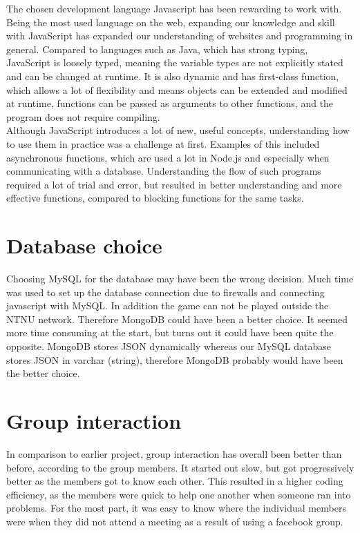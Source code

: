 The chosen development language Javascript has been rewarding to work with. Being the most used language on the web, expanding our knowledge and skill with JavaScript has expanded our understanding of websites and programming in general. Compared to languages such as Java, which has strong typing, JavaScript is loosely typed, meaning the variable types are not explicitly stated and can be changed at runtime. It is also dynamic and has first-class function, which allows a lot of flexibility and means objects can be extended and modified at runtime, functions can be passed as arguments to other functions, and the program does not require compiling.\\
\newline
Although JavaScript introduces a lot of new, useful concepts, understanding how to use them in practice was a challenge at first. Examples of this included asynchronous functions, which are used a lot in Node.js and especially when communicating with a database. Understanding the flow of such programs required a lot of trial and error, but resulted in better understanding and more effective functions, compared to blocking functions for the same tasks.\\

\section{Database choice}

Choosing MySQL for the database may have been the wrong decision. Much time was used to set up the database connection due to firewalls and connecting javascript with MySQL. In addition the game can not be played outside the NTNU network. Therefore MongoDB could have been a better choice. It seemed more time consuming at the start, but turns out it could have been quite the opposite. MongoDB stores JSON dynamically whereas our MySQL database stores JSON in varchar (string), therefore MongoDB probably would have been the better choice.


\section{Group interaction}

In comparison to earlier project, group interaction has overall been better than before, according to the group members. It started out slow, but got progressively better as the members got to know each other. This resulted in a higher coding efficiency, as the members were quick to help one another when someone ran into problems. For the most part, it was easy to know where the individual members were when they did not attend a meeting as a result of using a facebook group.

